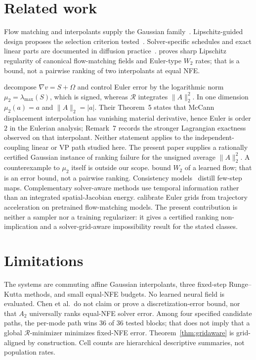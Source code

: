 \documentclass{article}
\newcommand{\wtwo}{W_2}
\newcommand{\cR}{\mathcal{R}}
\begin{document}
\section{Related work}
\label{sec:related}

Flow matching and interpolants supply the Gaussian
family~\citep{lipman2023flow,albergo2025stochastic,liu2023rectified,tong2024conditional}.
Lipschitz-guided design proposes the selection criterion
tested~\citep{lipschitzguided2025}. Solver-specific schedules and exact
linear parts are documented in diffusion
practice~\citep{sabour2024align,karras2022edm,lu2022dpmsolver,zhang2023deis}.
\citet{stephanovitch2026lipschitz} proves sharp Lipschitz regularity of
canonical flow-matching fields and Euler-type $\wtwo$ rates; that is a
bound, not a pairwise ranking of two interpolants at equal NFE.

\citet{tao2026strain} decompose $\nabla v=S+\Omega$ and control Euler
error by the logarithmic norm $\mu_2=\lambda_{\max}(S)$, which is
signed, whereas $\cR$ integrates $\|A\|_2^2$. In one dimension
$\mu_2(a)=a$ and $\|A\|_2=|a|$. Their Theorem~5 states that McCann
displacement interpolation has vanishing material derivative, hence
Euler is order $2$ in the Eulerian analysis; Remark~7 records the
stronger Lagrangian exactness observed on that interpolant. Neither
statement applies to the independent-coupling linear or VP path
studied here. The present paper supplies a rationally certified
Gaussian instance of ranking failure for the unsigned average
$\|A\|_2^2$. A counterexample to $\mu_2$ itself is outside our
scope. \citet{benton2024error} bound $\wtwo$ of a learned flow; that is
an error bound, not a pairwise ranking. Consistency
models~\citep{song2023consistency} distill few-step maps.
Complementary solver-aware methods use temporal information rather than
an integrated spatial-Jacobian energy.
\citet{gupta2026sharpen} calibrate Euler grids from trajectory
acceleration on pretrained flow-matching models. The present
contribution is neither a sampler nor a training regularizer: it gives
a certified ranking non-implication and a solver-grid-aware
impossibility result for the stated classes.

\section{Limitations}
\label{sec:limits}

The systems are commuting affine Gaussian interpolants, three
fixed-step Runge--Kutta methods, and small equal-NFE budgets. No
learned neural field is evaluated. Chen et al.\ do not claim or prove a
discretization-error bound, nor that $A_2$ universally ranks equal-NFE
solver error. Among four specified candidate paths, the
per-mode path wins $36$ of $36$ tested blocks; that does not
imply that a global $\cR$-minimizer minimizes fixed-NFE error.
Theorem~\ref{thm:gridaware} is grid-aligned by construction. Cell
counts are hierarchical descriptive summaries, not population rates.
\end{document}
